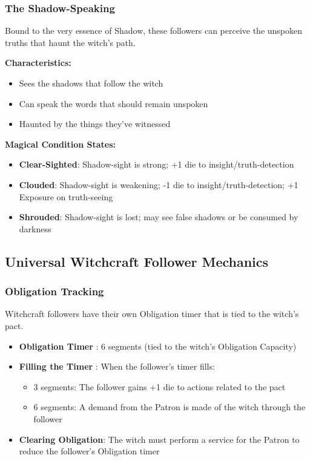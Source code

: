 \subsubsection{The Shadow-Speaking}
Bound to the very essence of Shadow, these followers can perceive the unspoken truths that haunt the witch's path.

\textbf{Characteristics:}
\begin{itemize}
    \item Sees the shadows that follow the witch
    \item Can speak the words that should remain unspoken
    \item Haunted by the things they've witnessed
\end{itemize}

\textbf{Magical Condition States:}
\begin{itemize}
    \item \textbf{Clear-Sighted}: Shadow-sight is strong; +1 die to insight/truth-detection
    \item \textbf{Clouded}: Shadow-sight is weakening; -1 die to insight/truth-detection; +1 Exposure on truth-seeing
    \item \textbf{Shrouded}: Shadow-sight is lost; may see false shadows or be consumed by darkness
\end{itemize}

\subsection{Universal Witchcraft Follower Mechanics}

\subsubsection{Obligation Tracking}
Witchcraft followers have their own Obligation timer that is tied to the witch's pact.

\begin{itemize}
    \item \textbf{Obligation Timer }: 6 segments (tied to the witch's Obligation Capacity)
    \item \textbf{Filling the Timer }: When the follower's timer fills:
    \begin{itemize}
        \item 3 segments: The follower gains +1 die to actions related to the pact
        \item 6 segments: A demand from the Patron is made of the witch through the follower
    \end{itemize}
    \item \textbf{Clearing Obligation}: The witch must perform a service for the Patron to reduce the follower's Obligation timer
\end{itemize}

